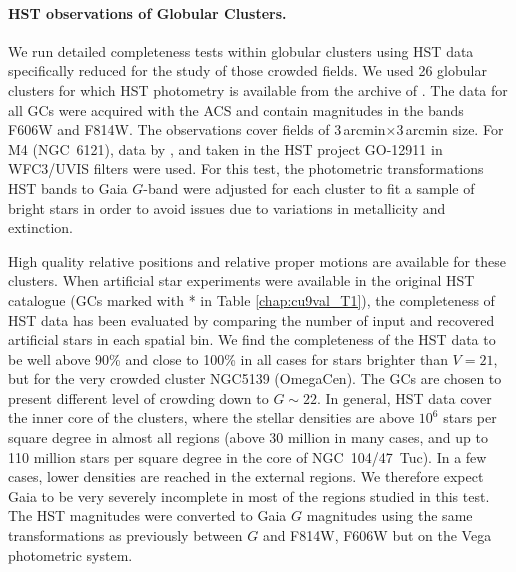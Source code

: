 \paragraph{HST observations of Globular Clusters.} We run detailed completeness tests within globular clusters using HST data specifically reduced for the study of those crowded fields. We used 26 globular clusters for which HST photometry is available from the archive of \citet[][see Table \ref{chap:cu9val_T1}]{2007AJ....133.1658S}. %
The data for all GCs were acquired with the ACS and contain magnitudes in the bands F606W and F814W. The observations cover fields of 3\,arcmin$\times$3\,arcmin size.  For M4 (NGC~6121), data by  \citet{2013AN....334.1062B}, and \citet{2015MNRAS.454.2621M} %
 taken in the HST project GO-12911 in WFC3/UVIS filters were used. For this test, the photometric transformations HST bands to Gaia $G$-band were adjusted for each cluster to fit a sample of bright stars in order to avoid issues due to variations in metallicity and extinction.

High quality relative positions and relative proper motions are available for these clusters. When artificial star experiments were available in the original HST catalogue (GCs marked  with * in Table \ref{chap:cu9val_T1}), the completeness of HST data has been evaluated by comparing the number of input and recovered artificial stars in each spatial bin. We find the completeness of the HST data to be well above 90\% and close to 100\% in all cases for  stars brighter than $V=21$, but for the very crowded cluster NGC5139 (OmegaCen).
The GCs are chosen to present different level of crowding down to $G\sim 22$. In general, HST data cover the inner core of the clusters, where the stellar densities are above $10^6$ stars per square degree in almost all regions (above 30 million in many cases, and up to 110 million stars per square degree in the core of NGC~104/47~Tuc). In a few cases, lower densities are reached in the external regions. We therefore expect Gaia to be very severely incomplete in most of the regions studied in this test.
The HST magnitudes were converted to Gaia $G$ magnitudes using the same transformations as previously between $G$ and F814W, F606W but on the Vega photometric system. 

